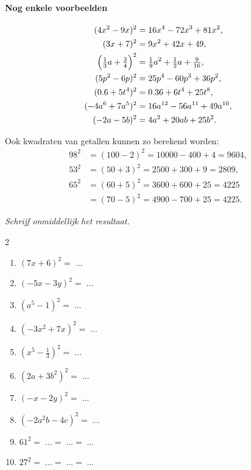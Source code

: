 \documentclass{bis}
\begin{document}
\paragraph*{Nog enkele voorbeelden}
\[
\begin{aligned}
(4x^2-9x)^2 &= 16x^4-72x^3+81x^2,\\
(3x+7)^2 &= 9x^2+42x+49,\\
\Bigl(\tfrac{1}{3}a+\tfrac{3}{4}\Bigr)^2 &= \tfrac{1}{9}a^2+\tfrac{1}{2}a+\tfrac{9}{16},\\
(5p^2-6p)^2 &= 25p^4-60p^3+36p^2,\\
(0.6+5t^4)^2 &= 0.36+6t^4+25t^8,\\
({-}4a^6+7a^5)^2 &= 16a^{12}-56a^{11}+49a^{10},\\
({-}2a-5b)^2 &= 4a^2+20ab+25b^2.
\end{aligned}
\]

Ook kwadraten van getallen kunnen zo berekend worden:
\[
\begin{aligned}
98^2&=(100-2)^2=10000-400+4=9604,\\
53^2&=(50+3)^2=2500+300+9=2809,\\
65^2&=(60+5)^2=3600+600+25=4225\\
     &=(70-5)^2=4900-700+25=4225.
\end{aligned}
\]

\begin{exercise}
\emph{Schrijf onmiddellijk het resultaat.}
\begin{multicols}{2}
  \begin{enumerate}
  \item \((7x+6)^2=\;\ldots\)
  \item \(({-}5x-3y)^2=\;\ldots\)
  \item \((a^5-1)^2=\;\ldots\)
  \item \(({-}3x^2+7x)^2=\;\ldots\)
  \item \((x^5-\tfrac{1}{3})^2=\;\ldots\)
  \item \((2a+3b^2)^2=\;\ldots\)
  \item \(({-}x-2y)^2=\;\ldots\)
  \item \(({-}2a^2b-4c)^2=\;\ldots\)
  \item \(61^2=\;\ldots=\;\ldots=\;\ldots\)
  \item \(27^2=\;\ldots=\;\ldots=\;\ldots\)
  \end{enumerate}
\end{multicols}
\end{exercise}
\end{document}
